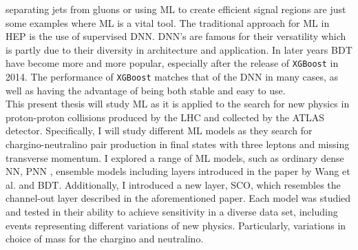 separating jets from gluons \cite{PhysRevD.44.2025} or using \ac{ML} to create efficient signal regions \cite{baldi_searching_2014} are just some examples
where \ac{ML} is a vital tool. The traditional approach for \ac{ML} in \ac{HEP} is the use of supervised
\ac{DNN}. \ac{DNN}'s are famous for their versatility which is partly due to their diversity in architecture and 
application. In later years \ac{BDT} have become more and more popular, especially after the release of \verb!XGBoost! \cite{XGB}
in 2014. The performance of \verb!XGBoost! matches that of the \ac{DNN} in many cases, as well as having the advantage 
of being both stable and easy to use. \newline
\\
This present thesis will study \ac{ML} as it is applied to the search for new physics in proton-proton collisions produced by the \ac{LHC} and collected by 
the \acs{ATLAS} detector. Specifically, I will study different \ac{ML} models as they search for chargino-neutralino pair production in final states 
with three leptons and missing transverse momentum. I explored a range of \ac{ML} models, such as ordinary dense \acl{NN}, \acl{PNN} \cite{PNN},
ensemble models including layers introduced in the paper by Wang et al. \cite{wang_maxout_2013} and \acl{BDT}. Additionally, I introduced a new layer, \acl{SCO}, which 
resembles the channel-out layer described in the aforementioned paper. Each model was studied and tested in their ability to achieve sensitivity in a diverse 
data set, including events representing different variations of new physics. Particularly, variations in choice of mass for the chargino and neutralino.
\newpage
